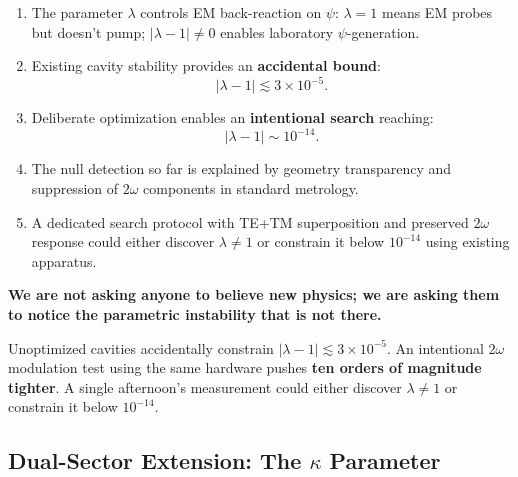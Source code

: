 \begin{enumerate}
\item The parameter $\lambda$ controls EM back-reaction on $\psi$: 
$\lambda = 1$ means EM probes but doesn't pump; $|\lambda - 1| \neq 0$ 
enables laboratory $\psi$-generation.

\item Existing cavity stability provides an \textbf{accidental bound}:
\begin{equation}
|\lambda - 1| \lesssim 3 \times 10^{-5}.
\end{equation}

\item Deliberate optimization enables an \textbf{intentional search} reaching:
\begin{equation}
|\lambda - 1| \sim 10^{-14}.
\end{equation}

\item The null detection so far is explained by geometry transparency and 
suppression of $2\omega$ components in standard metrology.

\item A dedicated search protocol with TE+TM superposition and preserved 
$2\omega$ response could either discover $\lambda \neq 1$ or constrain it 
below $10^{-14}$ using existing apparatus.
\end{enumerate}

\begin{tcolorbox}[colback=green!5!white, colframe=green!50!black, title=Key Result]
\textbf{We are not asking anyone to believe new physics; we are asking 
them to notice the parametric instability that is not there.}

Unoptimized cavities accidentally constrain $|\lambda - 1| \lesssim 3 \times 10^{-5}$. 
An intentional $2\omega$ modulation test using the same hardware pushes 
\textbf{ten orders of magnitude tighter}. A single afternoon's measurement 
could either discover $\lambda \neq 1$ or constrain it below $10^{-14}$.
\end{tcolorbox}

\subsection{Dual-Sector Extension: The $\kappa$ Parameter}\label{sec:kappa-parameter}

